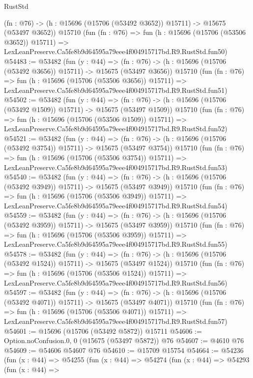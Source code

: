 \begin{lexlean}{RustStd}
\begin{coremodule}
    (fn : @76) -> (h : @15696 (@15706 (@53492 @3652)) @15711) -> @15675 (@53497 @3652))
    @15710
    (fun (fn : @76) =>
    fun (h : @15696 (@15706 (@53506 @3652)) @15711) =>
    LexLeanPreserve.Ca5fe8b9d64595a79eee4f004915717bd.R9.RustStd.fun50)
@54483 := @53482
    (fun (y : @44) =>
    (fn : @76) -> (h : @15696 (@15706 (@53492 @3656)) @15711) -> @15675 (@53497 @3656))
    @15710
    (fun (fn : @76) =>
    fun (h : @15696 (@15706 (@53506 @3656)) @15711) =>
    LexLeanPreserve.Ca5fe8b9d64595a79eee4f004915717bd.R9.RustStd.fun51)
@54502 := @53482
    (fun (y : @44) =>
    (fn : @76) -> (h : @15696 (@15706 (@53492 @1509)) @15711) -> @15675 (@53497 @1509))
    @15710
    (fun (fn : @76) =>
    fun (h : @15696 (@15706 (@53506 @1509)) @15711) =>
    LexLeanPreserve.Ca5fe8b9d64595a79eee4f004915717bd.R9.RustStd.fun52)
@54521 := @53482
    (fun (y : @44) =>
    (fn : @76) -> (h : @15696 (@15706 (@53492 @3754)) @15711) -> @15675 (@53497 @3754))
    @15710
    (fun (fn : @76) =>
    fun (h : @15696 (@15706 (@53506 @3754)) @15711) =>
    LexLeanPreserve.Ca5fe8b9d64595a79eee4f004915717bd.R9.RustStd.fun53)
@54540 := @53482
    (fun (y : @44) =>
    (fn : @76) -> (h : @15696 (@15706 (@53492 @3949)) @15711) -> @15675 (@53497 @3949))
    @15710
    (fun (fn : @76) =>
    fun (h : @15696 (@15706 (@53506 @3949)) @15711) =>
    LexLeanPreserve.Ca5fe8b9d64595a79eee4f004915717bd.R9.RustStd.fun54)
@54559 := @53482
    (fun (y : @44) =>
    (fn : @76) -> (h : @15696 (@15706 (@53492 @3959)) @15711) -> @15675 (@53497 @3959))
    @15710
    (fun (fn : @76) =>
    fun (h : @15696 (@15706 (@53506 @3959)) @15711) =>
    LexLeanPreserve.Ca5fe8b9d64595a79eee4f004915717bd.R9.RustStd.fun55)
@54578 := @53482
    (fun (y : @44) =>
    (fn : @76) -> (h : @15696 (@15706 (@53492 @1524)) @15711) -> @15675 (@53497 @1524))
    @15710
    (fun (fn : @76) =>
    fun (h : @15696 (@15706 (@53506 @1524)) @15711) =>
    LexLeanPreserve.Ca5fe8b9d64595a79eee4f004915717bd.R9.RustStd.fun56)
@54597 := @53482
    (fun (y : @44) =>
    (fn : @76) -> (h : @15696 (@15706 (@53492 @4071)) @15711) -> @15675 (@53497 @4071))
    @15710
    (fun (fn : @76) =>
    fun (h : @15696 (@15706 (@53506 @4071)) @15711) =>
    LexLeanPreserve.Ca5fe8b9d64595a79eee4f004915717bd.R9.RustStd.fun57)
@54601 := @15696 (@15706 (@53492 @5872)) @15711
@54606 := Option.noConfusion.{0, 0} (@15675 (@53497 @5872)) @76
@54607 := @4610 @76
@54609 := @54606 @54607 @76
@54610 := @15709 @15754
@54664 := @54236
    (fun (x : @44) =>
    @54255
      (fun (x : @44) =>
      @54274
        (fun (x : @44) =>
        @54293
          (fun (x : @44) =>

\end{coremodule}
\end{lexlean}
